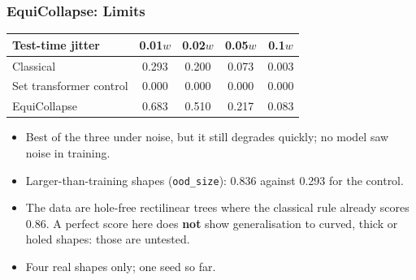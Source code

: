 \begin{frame}[fragile]\frametitle{EquiCollapse: Limits}
\begin{center}
\small
\begin{tabular}{@{}lcccc@{}}
\toprule
\textbf{Test-time jitter} & 0.01$w$ & 0.02$w$ & 0.05$w$ & 0.1$w$ \\
\midrule
Classical & 0.293 & 0.200 & 0.073 & 0.003 \\
Set transformer control & 0.000 & 0.000 & 0.000 & 0.000 \\
EquiCollapse & 0.683 & 0.510 & 0.217 & 0.083 \\
\bottomrule
\end{tabular}
\end{center}

\begin{itemize}
\item Best of the three under noise, but it still degrades quickly; no model saw noise in training.
\item Larger-than-training shapes (\texttt{ood\_size}): 0.836 against 0.293 for the control.
\item The data are hole-free rectilinear trees where the classical rule already scores 0.86. A perfect score here does \textbf{not} show generalisation to curved, thick or holed shapes: those are untested.
\item Four real shapes only; one seed so far.
\end{itemize}
\end{frame}
